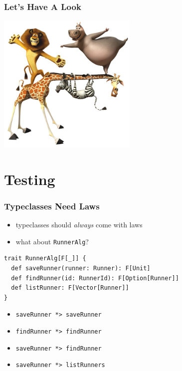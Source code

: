 \documentclass{beamer}
\begin{document}
\begin{frame}
  \frametitle{Let's Have A Look}
  \begin{center}
    \includegraphics[width=0.5\textwidth]{../pics/review.jpg}
  \end{center}
\end{frame}

\section{Testing}

\begin{frame}[fragile]
  \frametitle{Typeclasses Need Laws}
  \begin{itemize}
  \item<1-> typeclasses should \textit{always} come with laws
  \item<1-> what about \texttt{RunnerAlg}?
  \end{itemize}
\begin{verbatim}
trait RunnerAlg[F[_]] {
  def saveRunner(runner: Runner): F[Unit]
  def findRunner(id: RunnerId): F[Option[Runner]]
  def listRunner: F[Vector[Runner]]
}
\end{verbatim}
  \begin{itemize}
  \item<2-> \texttt{saveRunner *> saveRunner}
  \item<2-> \texttt{findRunner *> findRunner}
  \item<2-> \texttt{saveRunner *> findRunner}
  \item<2-> \texttt{saveRunner *> listRunners}
  \end{itemize}
\end{frame}
\end{document}
